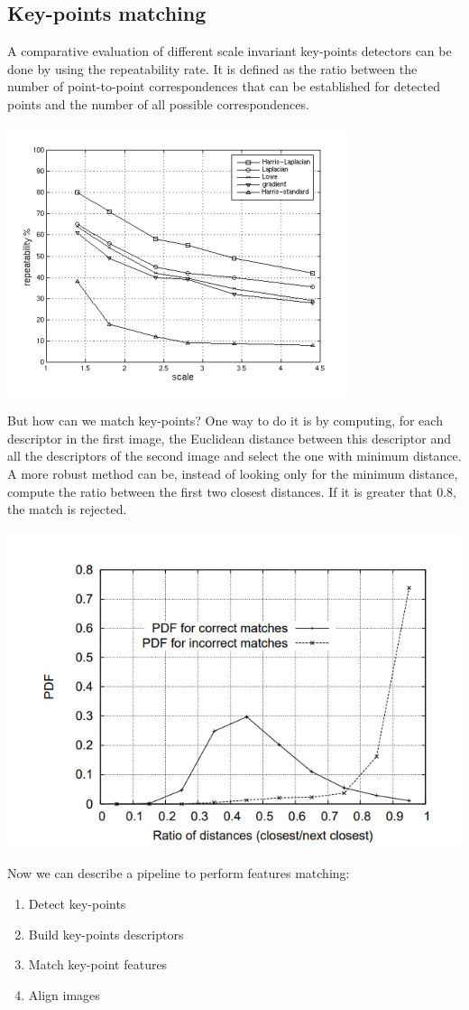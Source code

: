 \subsection{Key-points matching}
A comparative evaluation of different scale invariant key-points detectors can be done by using the repeatability rate. It is defined as the ratio between the number of point-to-point correspondences that can be established for detected points and the number of all possible correspondences.
\begin{center}
    \includegraphics[scale = 1.3]{images/repeatability rate.png}
\end{center}
But how can we match key-points? One way to do it is by computing, for each descriptor in the first image, the Euclidean distance between this descriptor and all the descriptors of the second image and select the one with minimum distance. A more robust method can be, instead of looking only for the minimum distance, compute the ratio between the first two closest distances. If it is greater that 0.8, the match is rejected. 
\begin{center}
    \includegraphics[]{images/ratio closest distances.png}
\end{center}
Now we can describe a pipeline to perform features matching:
\begin{enumerate}
    \item Detect key-points
    \item Build key-points descriptors
    \item Match key-point features
    \item Align images
\end{enumerate}

